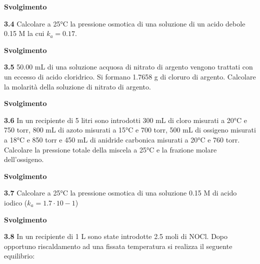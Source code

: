 \vspace{0.2cm}\large\textbf{Svolgimento}\normalsize

\vspace{0.2cm}

\vspace{0.2cm}\textbf{3.4} Calcolare a 25°C la pressione osmotica di una soluzione di un acido debole 0.15 M la cui $k_a=0.17$.

\vspace{0.2cm}\large\textbf{Svolgimento}\normalsize

\vspace{0.2cm}

\vspace{0.2cm}\textbf{3.5} 50.00 mL di una soluzione acquosa di nitrato di argento vengono trattati con un eccesso di acido
cloridrico. Si formano 1.7658 g di cloruro di argento. Calcolare la molarità della soluzione di nitrato
di argento.

\vspace{0.2cm}\large\textbf{Svolgimento}\normalsize

\vspace{0.2cm}

\vspace{0.2cm}\textbf{3.6} In un recipiente di 5 litri sono introdotti 300 mL di cloro misurati a 20°C e 750 torr, 800 mL di azoto misurati a 15°C e 700 torr, 500 mL di ossigeno misurati a 18°C e 850 torr e 450 mL di anidride carbonica misurati a 20°C e 760 torr. Calcolare la pressione totale della miscela a 25°C e la frazione molare dell’ossigeno.

\vspace{0.2cm}\large\textbf{Svolgimento}\normalsize

\vspace{0.2cm}

\vspace{0.2cm}\textbf{3.7} Calcolare a 25°C la pressione osmotica di una soluzione 0.15 M di acido iodico ($k_a= 1.7 \cdot 10-1 $)

\vspace{0.2cm}\large\textbf{Svolgimento}\normalsize

\vspace{0.2cm}

\vspace{0.2cm}\textbf{3.8} In un recipiente di 1 L sono state introdotte 2.5 moli di NOCl. Dopo opportuno riscaldamento ad una fissata temperatura si realizza il seguente equilibrio:

\begin{center}
\end{center}

